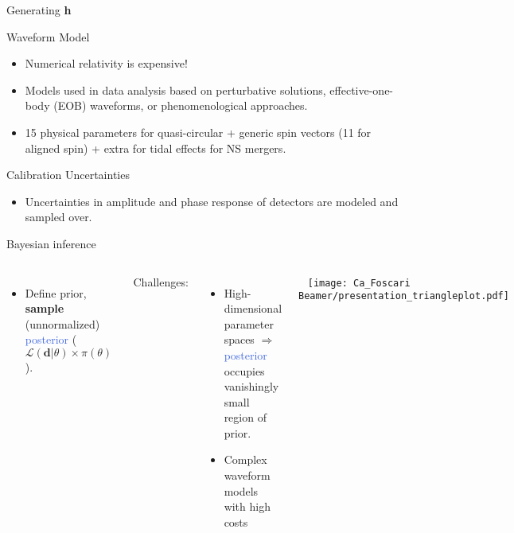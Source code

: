 \documentclass[aspectratio=169, 11pt]{beamer}
\begin{document}
\begin{frame}{Generating \textbf{h}}
    \begin{block}{Waveform Model}
        \begin{itemize}
            \item Numerical relativity is expensive!
            \item Models used in data analysis based on perturbative solutions, effective-one-body (EOB) waveforms, or phenomenological approaches. 
            \item 15 physical parameters for quasi-circular + generic spin vectors (11 for aligned spin) + extra for tidal effects for NS mergers.
        \end{itemize}
    \end{block}
    \begin{block}{Calibration Uncertainties}
    \begin{itemize}
        \item Uncertainties in amplitude and phase response of detectors are modeled and sampled over.
    \end{itemize} 
\end{block}
\end{frame}

\begin{frame}{Bayesian inference}
\begin{columns}
    
\begin{itemize}
    \item Define \textcolor{BurntOrange}{prior}, \textbf{sample} (unnormalized) \textcolor{RoyalBlue}{posterior} ($\mathcal{L}(\textbf{d} | \theta) \times \pi(\theta)$).
\end{itemize}
\vspace{2em}
\raggedright
Challenges:\vfill
    \begin{itemize}
        \item High-dimensional parameter spaces $\Rightarrow$ \textcolor{RoyalBlue}{posterior} occupies vanishingly small region of \textcolor{BurntOrange}{prior}.
        \item Complex waveform models with high costs
    \end{itemize}
    \vfill 

\
\vspace{-2em}
\centering
\texttt{[image: Ca\_Foscari Beamer/presentation\_triangleplot.pdf]}
\end{columns}
\end{frame}
\end{document}
